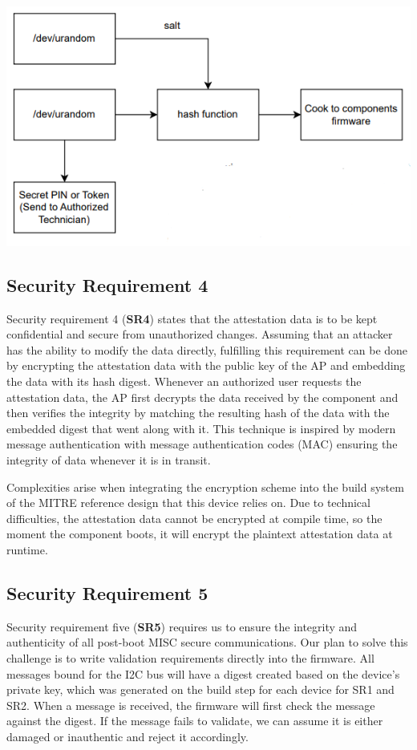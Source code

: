 \documentclass{prace}
\begin{document}
\includegraphics{./diagramSR3.png}

\subsection{Security Requirement 4}
Security requirement 4 (\textbf{SR4}) states that the attestation data is to be kept confidential and secure from unauthorized changes.
 Assuming that an attacker has the ability to modify the data directly, fulfilling this requirement can be done by encrypting 
 the attestation data with the public key of the AP and embedding the data with its hash digest. Whenever an authorized user 
 requests the attestation data, the AP first decrypts the data received by the component and then verifies the integrity by 
 matching the resulting hash of the data with the embedded digest that went along with it. This technique is inspired by modern 
 message authentication with message authentication codes (MAC) ensuring the integrity of data whenever it is in transit.

 Complexities arise when integrating the encryption scheme into the build system of the MITRE reference design that this device relies on.
 Due to technical difficulties, the attestation data cannot be encrypted at compile time, so the moment the component boots, it will encrypt the plaintext
 attestation data at runtime.

\subsection{Security Requirement 5}
Security requirement five (\textbf{SR5}) requires us to ensure the integrity and authenticity of all
post-boot MISC secure communications. Our plan to solve this challenge is to write validation
requirements directly into the firmware. All messages bound for the I2C bus will have a
digest created based on the device's private key, which was generated on the build step for
each device for SR1 and SR2. When a message is received, the firmware will first check the message
against the digest. If the message fails to validate, we can assume it is either damaged
or inauthentic and reject it accordingly.
\end{document}
